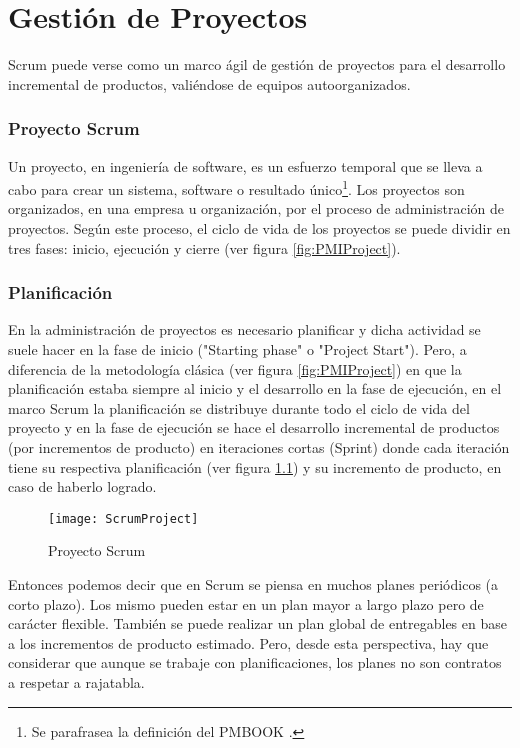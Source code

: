 \chapter{Gestión de Proyectos}

Scrum puede verse como un marco ágil de gestión de proyectos para el desarrollo incremental de productos, valiéndose de equipos autoorganizados. 



\subsection{Proyecto Scrum}

Un proyecto, en ingeniería de software, es un esfuerzo temporal que se lleva a cabo para crear un sistema, software o resultado único\footnote{Se parafrasea la definición del PMBOOK \cite{PMBOK-2004}.}. Los proyectos son organizados, en una empresa u organización, por el proceso de administración de proyectos. Según este proceso, el ciclo de vida de los proyectos se puede dividir en tres fases: inicio, ejecución y cierre (ver figura \ref{fig:PMIProject}). 

\subsection{Planificación}

En la administración de proyectos es necesario planificar y dicha actividad se suele hacer en la fase de inicio ("Starting phase" o "Project Start"). Pero, a diferencia de la metodología clásica (ver figura \ref{fig:PMIProject}) en que la planificación estaba siempre al inicio y el desarrollo en la fase de ejecución, en el marco Scrum la planificación se distribuye durante todo el ciclo de vida del proyecto y en la fase de ejecución se hace el desarrollo incremental de productos (por incrementos de producto) en iteraciones cortas (Sprint) donde cada iteración tiene su respectiva planificación (ver figura \ref{fig:ScrumProject}) y su incremento de producto, en caso de haberlo logrado.

\begin{figure}[h]
  \centering
  \texttt{[image: ScrumProject]}
  \caption{Proyecto Scrum}
  \centering
  \label{fig:ScrumProject} %
\end{figure}

Entonces podemos decir que en Scrum se piensa en muchos planes periódicos (a corto plazo). Los mismo pueden estar en un plan mayor a largo plazo pero de carácter flexible. También se puede realizar un plan global de entregables en base a los incrementos de producto estimado. Pero, desde esta perspectiva, hay que considerar que aunque se trabaje con planificaciones, los planes no son contratos a respetar a rajatabla.

